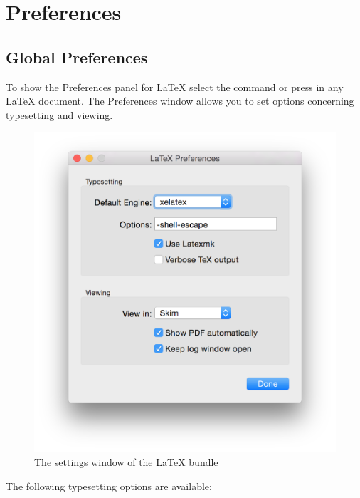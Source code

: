 \documentclass[11pt, x11names]{article}
\begin{document}
\section{Preferences}
\label{sec:preferences}

\subsection{Global Preferences}

To show the Preferences panel for LaTeX select the command  or press \keys{\Alt + \cmd + ,} in any LaTeX document. The Preferences window allows you to set options concerning typesetting and viewing.

\begin{figure}[h]
  \centering
    \includegraphics[width=.75\textwidth]{Figures/Preferences}
  \caption{The settings window of the LaTeX bundle}
  \label{fig:Figures_Preferences}
\end{figure}

The following typesetting options are available:
\end{document}

